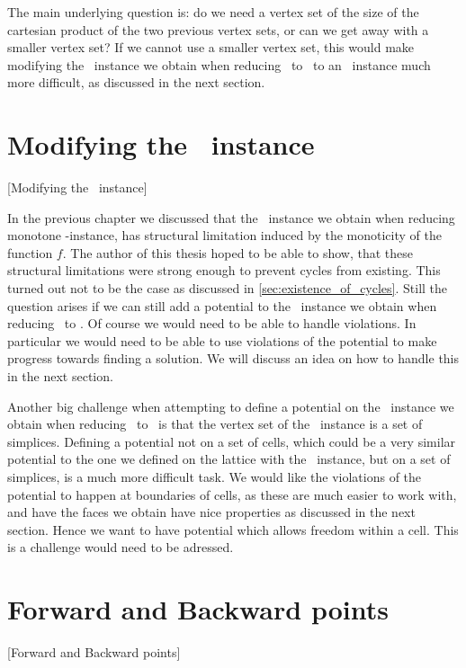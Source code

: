 The main underlying question is: do we need a vertex set of the size of the cartesian product of the two previous vertex sets, or can we get away with a smaller vertex set? If we cannot use a smaller vertex set, this would make modifying the \EndOfLine\ instance we obtain when reducing \Tarskistar\ to \EndOfLine\ to an \EndOfPotentialLine\ instance much more difficult, as discussed in the next section.

\section{Modifying the \EndOfLine\ instance}[Modifying the \EndOfLine\ instance]

In the previous chapter we discussed that the \EndOfLine\ instance we obtain when reducing monotone \Tarskistar-instance, has structural limitation induced by the monoticity of the function $f$. The author of this thesis hoped to be able to show, that these structural limitations were strong enough to prevent cycles from existing. This turned out not to be the case as discussed in \cref{sec:existence_of_cycles}. Still the question arises if we can still add a potential to the \EndOfLine\ instance we obtain when reducing \Tarskistar\ to \EndOfLine\@. Of course we would need to be able to handle violations. In particular we would need to be able to use violations of the potential to make progress towards finding a solution. We will discuss an idea on how to handle this in the next section.

Another big challenge when attempting to define a potential on the \EndOfLine\ instance we obtain when reducing \Tarskistar\ to \EndOfLine\ is that the vertex set of the \EndOfLine\ instance is a set of simplices. Defining a potential not on a set of cells, which could be a very similar potential to the one we defined on the lattice with the \Localopt\ instance, but on a set of simplices, is a much more difficult task. We would like the violations of the potential to happen at boundaries of cells, as these are much easier to work with, and have the faces we obtain have nice properties as discussed in the next section. Hence we want to have potential which allows freedom within a cell. This is a challenge would need to be adressed.

\section{Forward and Backward points}[Forward and Backward points]